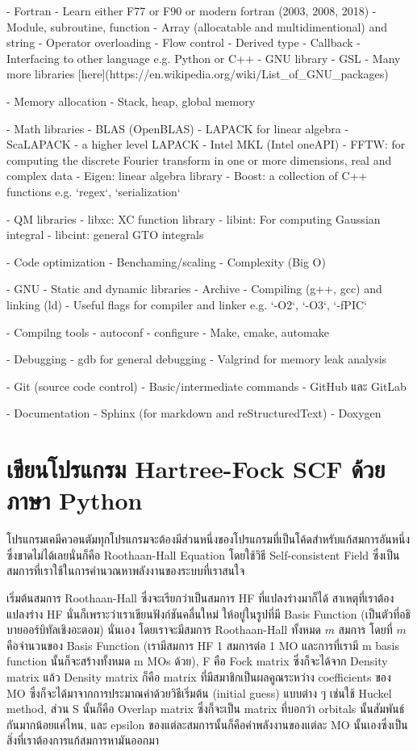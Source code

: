   - Fortran
    - Learn either F77 or F90 or modern fortran (2003, 2008, 2018)
    - Module, subroutine, function
    - Array (allocatable and multidimentional) and string
    - Operator overloading
    - Flow control
    - Derived type
    - Callback
    - Interfacing to other language e.g. Python or C++
  - GNU library
    - GSL
    - Many more libraries [here](https://en.wikipedia.org/wiki/List_of_GNU_packages)

- Memory allocation
  - Stack, heap, global memory

- Math libraries
  - BLAS (OpenBLAS)
  - LAPACK for linear algebra
  - ScaLAPACK - a higher level LAPACK
  - Intel MKL (Intel oneAPI)
  - FFTW: for computing the discrete Fourier transform in one or more dimensions, real and complex data
  - Eigen: linear algebra library
  - Boost: a collection of C++ functions e.g. `regex`, `serialization`

- QM libraries
  - libxc: XC function library
  - libint: For computing Gaussian integral
  - libcint: general GTO integrals

- Code optimization
  - Benchaming/scaling
  - Complexity (Big O)

- GNU
  - Static and dynamic libraries
  - Archive
  - Compiling (g++, gcc) and linking (ld)
  - Useful flags for compiler and linker e.g. `-O2`, `-O3`, `-fPIC`

- Compilng tools
  - autoconf
  - configure
  - Make, cmake, automake

- Debugging
  - gdb for general debugging
  - Valgrind for memory leak analysis

- Git (source code control)
  - Basic/intermediate commands
  - GitHub และ GitLab

- Documentation
  - Sphinx (for markdown and reStructuredText)
  - Doxygen

\section{เขียนโปรแกรม Hartree-Fock SCF ด้วยภาษา Python}

โปรแกรมเคมีควอนตัมทุกโปรแกรมจะต้องมีส่วนหนึ่งของโปรแกรมที่เป็นโค้ดสำหรับแก้สมการอันหนึ่งซึ่งขาดไม่ได้เลยนั่นก็คือ Roothaan-Hall Equation 
โดยใช้วิธี Self-consistent Field ซึ่งเป็นสมการที่เราใช้ในการคำนวณหาพลังงานของระบบที่เราสนใจ

เริ่มต้นสมการ Roothaan-Hall ซึ่งจะเรียกว่าเป็นสมการ HF ที่แปลงร่างมาก็ได้ สาเหตุที่เราต้องแปลงร่าง HF นั่นก็เพราะว่าเราเขียนฟังก์ชันคลื่นใหม่%
ให้อยู่ในรูปที่มี Basis Function (เป็นตัวที่อธิบายออร์บิทัลเชิงอะตอม) นั่นเอง โดยเราจะมีสมการ Roothaan-Hall ทั้งหมด $m$ สมการ โดยที่ $m$ 
คือจำนวนของ Basis Function (เรามีสมการ HF 1 สมการต่อ 1 MO และการที่เรามี m basis function นั้นก็จะสร้างทั้งหมด m MOs ด้วย), 
F คือ Fock matrix ซึ่งก็จะได้จาก Density matrix แล้ว Density matrix ก็คือ matrix ที่มีสมาชิกเป็นผลคูณระหว่าง coefficients ของ 
MO ซึ่งก็จะได้มาจากการประมาณค่าด้วยวิธีเริ่มต้น (initial guess) แบบต่าง ๆ เช่นใช้ Huckel method, ส่วน S นั้นก็คือ Overlap matrix 
ซึ่งก็จะเป็น matrix ที่บอกว่า orbitals นั้นสัมพันธ์กันมากน้อยแค่ไหน, และ epsilon ของแต่ละสมการนั้นก็คือค่าพลังงานของแต่ละ MO 
นั้นเองซึ่งเป็นสิ่งที่เราต้องการแก้สมการหามันออกมา

